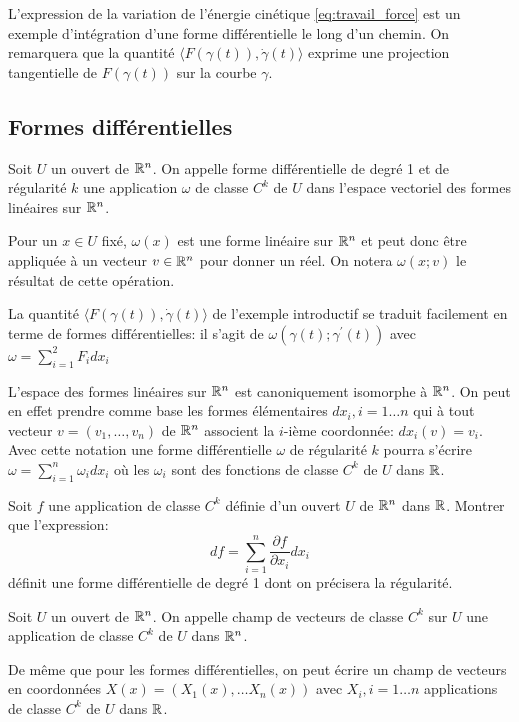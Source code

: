 L'expression de la variation de l'énergie cinétique \ref{eq:travail_force} est un exemple d'intégration d'une forme différentielle le long d'un chemin. On remarquera que la quantité $\langle F\left(\gamma(t)\right), \dot{\gamma}(t) \rangle$ exprime une projection tangentielle de $F\left(\gamma(t)\right)$ sur la courbe $\gamma$. 
\subsection{Formes différentielles}
\begin{fdefn}
Soit $U$ un ouvert de $\mathbb{R}^n$. On appelle forme différentielle de degré 1 et de régularité $k$ une application $\omega$ de classe $C^k$ de $U$ dans l'espace vectoriel des formes linéaires sur $\mathbb{R}^n$.  
\end{fdefn}
Pour un $x \in U$ fixé, $\omega(x)$ est une forme linéaire sur $\mathbb{R}^n$ et peut donc être appliquée à un vecteur $v \in \mathbb{R}^n$ pour donner un réel. On notera $\omega(x;v)$ le résultat de cette opération.

La quantité $\langle F\left(\gamma(t)\right), \dot{\gamma}(t) \rangle$ de l'exemple introductif se traduit facilement en terme de formes différentielles: il s'agit de $\omega(\gamma(t);\gamma^\prime(t))$ avec $\omega = \sum_{i=1}^2 F_i dx_i$

L'espace des formes linéaires sur $\mathbb{R}^n$ est canoniquement isomorphe à $\mathbb{R}^n$. On peut en effet prendre comme base les formes élémentaires $dx_i, i=1 \dots n$ qui à tout vecteur $v=(v_1,\dots,v_n)$ de $\mathbb{R}^n$ associent la $i$-ième coordonnée: $dx_i(v) = v_i$. Avec cette notation une forme différentielle $\omega$ de régularité $k$ pourra s'écrire $\omega = \sum_{i=1}^n \omega_i dx_i$ où les $\omega_i$ sont des fonctions de classe $C^k$ de $U$ dans $\mathbb{R}$. 
\begin{exercice}
Soit $f$ une application de classe $C^k$ définie d'un ouvert $U$ de $\mathbb{R}^n$ dans $\mathbb{R}$. Montrer que l'expression:
\[
df = \sum_{i=1}^n \frac{\partial f}{\partial x_i} dx_i
\]
définit une forme différentielle de degré 1 dont on précisera la régularité.
\end{exercice}
\begin{fdefn}
Soit $U$ un ouvert de $\mathbb{R}^n$. On appelle champ de vecteurs de classe $C^k$ sur $U$ une application de classe $C^k$ de $U$ dans $\mathbb{R}^n$. 
\end{fdefn}
De même que pour les formes différentielles, on peut écrire un champ de vecteurs en coordonnées $X(x) = (X_1(x),\dots X_n(x))$ avec $X_i, i=1 \dots n$ applications de classe $C^k$ de $U$ dans $\mathbb{R}$. 

